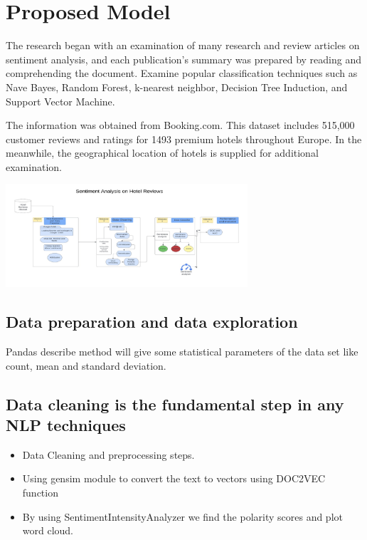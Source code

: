 \section{Proposed Model}
The research began with an examination of many research and review articles on sentiment analysis, and each publication's summary was prepared by reading and comprehending the document. Examine popular classification techniques such as Nave Bayes, Random Forest, k-nearest neighbor, Decision Tree Induction, and Support Vector Machine.

The information was obtained from Booking.com. This dataset includes 515,000 customer reviews and ratings for 1493 premium hotels throughout Europe. In the meanwhile, the geographical location of hotels is supplied for additional examination.

\includegraphics[width=9cm, height=6cm \textwidth]{block.jpeg}
\subsection{Data preparation and data exploration}

Pandas describe method will give some statistical parameters of the data set like count, mean and standard deviation.

\subsection{Data cleaning is the fundamental step in any NLP techniques}
\begin{itemize}

\item Data Cleaning and preprocessing steps.
\item Using gensim module to convert the text to vectors using DOC2VEC function 
\item By using SentimentIntensityAnalyzer we find the polarity scores and plot word cloud.
\end{itemize}

